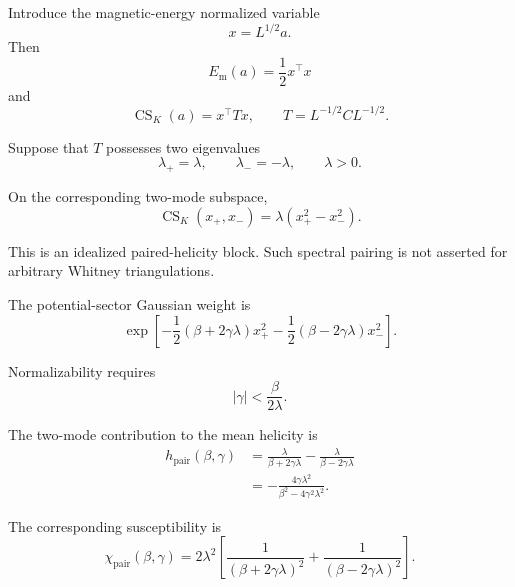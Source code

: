 \documentclass[11pt]{article}
\theoremstyle{definition}
\theoremstyle{remark}
\newcommand{\CS}{\operatorname{CS}}
\begin{document}
Introduce the magnetic-energy normalized variable
\begin{equation}
x=L^{1/2}a.
\label{eq:x}
\end{equation}
Then
\begin{equation}
E_{\mathrm m}(a)
=
\frac12x^\top x
\label{eq:normalized-energy}
\end{equation}
and
\begin{equation}
\CS_K(a)
=
x^\top Tx,
\qquad
T=L^{-1/2}CL^{-1/2}.
\label{eq:normalized-CS}
\end{equation}

Suppose that \(T\) possesses two eigenvalues
\begin{equation}
\lambda_+=\lambda,
\qquad
\lambda_-=-\lambda,
\qquad
\lambda>0.
\label{eq:paired}
\end{equation}

On the corresponding two-mode subspace,
\begin{equation}
\CS_K(x_+,x_-)
=
\lambda(x_+^2-x_-^2).
\label{eq:two-helicity}
\end{equation}

This is an idealized paired-helicity block. Such spectral
pairing is not asserted for arbitrary Whitney triangulations.

The potential-sector Gaussian weight is
\begin{equation}
\exp\left[
-\frac12
(\beta+2\gamma\lambda)x_+^2
-
\frac12
(\beta-2\gamma\lambda)x_-^2
\right].
\end{equation}

Normalizability requires
\begin{equation}
|\gamma|
<
\frac{\beta}{2\lambda}.
\label{eq:paired-domain}
\end{equation}

The two-mode contribution to the mean helicity is
\begin{align}
h_{\mathrm{pair}}(\beta,\gamma)
&=
\frac{\lambda}{
\beta+2\gamma\lambda
}
-
\frac{\lambda}{
\beta-2\gamma\lambda
}
\nonumber\\
&=
-\frac{
4\gamma\lambda^2
}{
\beta^2-4\gamma^2\lambda^2
}.
\label{eq:paired-helicity}
\end{align}

The corresponding susceptibility is
\begin{equation}
\chi_{\mathrm{pair}}(\beta,\gamma)
=
2\lambda^2
\left[
\frac{1}{
(\beta+2\gamma\lambda)^2
}
+
\frac{1}{
(\beta-2\gamma\lambda)^2
}
\right].
\label{eq:paired-susceptibility}
\end{equation}
\end{document}
